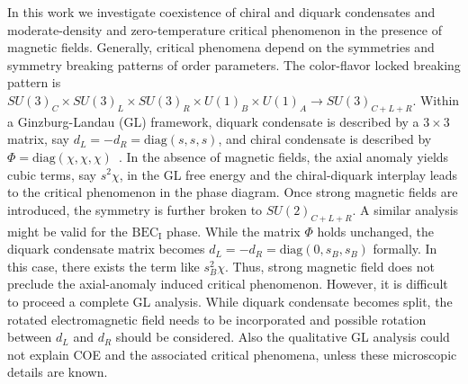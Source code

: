 \documentclass[prd, showpacs,nofootinbib,amsmath,amssymb,12pt]{revtex4}
\begin{document}
In this work we investigate coexistence of chiral and diquark condensates and moderate-density and zero-temperature critical phenomenon in the presence of magnetic fields. Generally, critical phenomena depend on the symmetries and symmetry breaking patterns of order parameters.
The color-flavor locked breaking pattern is 
 $SU(3)_C \times SU(3)_L \times SU(3)_R \times U(1)_B \times U(1)_A \rightarrow SU(3)_{C+L+R}$. Within a Ginzburg-Landau (GL) framework, diquark condensate is described by a $3\times 3$ matrix, say $d_L=-d_R=\text{diag}(s,s,s)$, and chiral condensate is described by $\Phi=\text{diag}(\chi,\chi,\chi)$~\cite{yamamoto2007phase,hatsuda2006new}.  
In the absence of magnetic fields, the axial anomaly yields cubic terms, say $s^2 \chi$, in the GL free energy and the chiral-diquark interplay leads to the critical phenomenon in the phase diagram.
Once strong magnetic fields are introduced, the symmetry is further broken to $SU(2)_{C+L+R}$\cite{ferrer2006color}.
A similar analysis might be valid for the $\text{BEC}_\text{I}$ phase. While the matrix $\Phi$ holds unchanged, the diquark condensate matrix becomes $d_L=-d_R=\text{diag}(0,s_B,s_B)$ formally. In this case, there exists the term like $s_B^2 \chi$.
Thus, strong magnetic field does not preclude the axial-anomaly induced critical phenomenon. 
However, it is difficult to proceed a complete GL analysis. While diquark condensate
becomes split, the rotated electromagnetic field needs to be incorporated and possible rotation between $d_L$ and $d_R$ should be considered. Also the qualitative GL analysis could not explain COE and the associated critical phenomena, unless these microscopic details are known.
\end{document}
